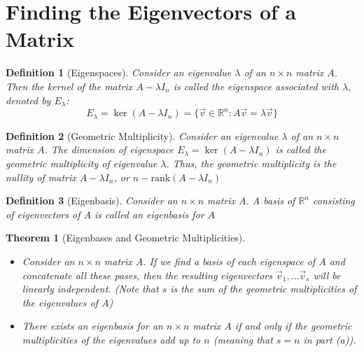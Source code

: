 \documentclass[10pt]{report}
\newtheorem{thm2}{Theorem}[section]
\newtheorem{def2}{Definition}[section]
\begin{document}
\section{Finding the Eigenvectors of a Matrix}
\begin{def2}[Eigenspaces]
Consider an eigenvalue $\lambda$ of an $n\times n$ matrix $A$. Then the kernel of the matrix $A-\lambda I_n$ is called the eigenspace associated with $\lambda$, denoted by $E_\lambda$:
$$E_\lambda = \ker (A-\lambda I_n) =\{\vec{v}\in \mathbb{R}^n: A\vec{v} = \lambda \vec{v}\}$$
\end{def2}
\begin{def2}[Geometric Multiplicity]
Consider an eigenvalue $\lambda$ of an $n\times n$ matrix $A$. The dimension of eigenspace $E_\lambda = \ker(A-\lambda I_n)$ is called the geometric multiplicity of eigenvalue $\lambda$. Thus, the geometric multiplicity is the nullity of matrix $A-\lambda I_n$, or $n-\text{rank}(A-\lambda I_n)$
\end{def2}
\begin{def2}[Eigenbasis]
Consider an $n\times n$ matrix $A$. A basis of $\mathbb{R}^n$ consisting of eigenvectors of $A$ is called an eigenbasis for $A$
\end{def2}
\begin{thm2}[Eigenbases and Geometric Multiplicities]
\begin{itemize}
\item[a.] Consider an $n\times n$ matrix $A$. If we find a basis of each eigenspace of $A$ and concatenate all these pases, then the resulting eigenvectors $\vec{v}_1,...\vec{v}_s$ will be linearly independent. (Note that $s$ is the sum of the geometric multiplicities of the eigenvalues of $A$)
\item[b.]There exists an eigenbasis for an $n\times n$ matrix $A$ if and only if the geometric multiplicities of the eigenvalues add up to $n$ (meaning that $s=n$ in part (a)).
\end{itemize}
\end{thm2}
\end{document}
